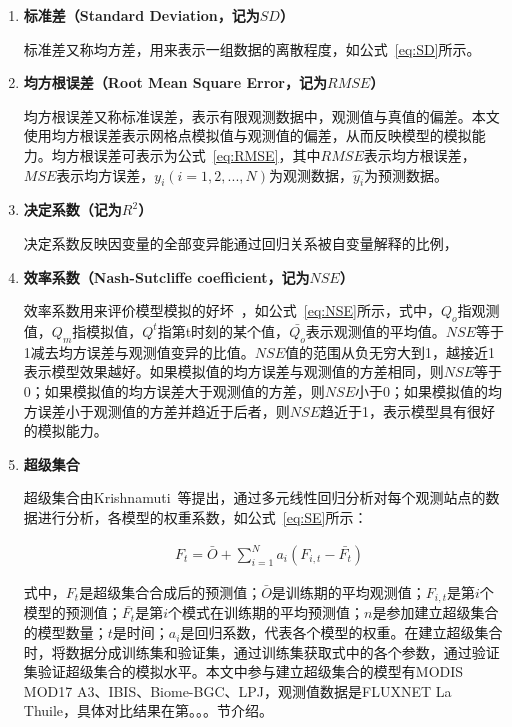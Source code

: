 \begin{enumerate}[(1)]
\item \textbf{标准差（Standard Deviation，记为$SD$）}

标准差又称均方差，用来表示一组数据的离散程度，如公式~\ref{eq:SD}所示。

\item \textbf{均方根误差（Root Mean Square Error，记为$RMSE$）}

均方根误差又称标准误差，表示有限观测数据中，观测值与真值的偏差。本文使用均方根误差表示网格点模拟值与观测值的偏差，从而反映模型的模拟能力。均方根误差可表示为公式~\ref{eq:RMSE}，其中$RMSE$表示均方根误差，$MSE$表示均方误差，$y_i(i=1,2,...,N)$为观测数据，$\hat{y_i}$为预测数据。

\item \textbf{决定系数（记为$R^2$）}

决定系数反映因变量的全部变异能通过回归关系被自变量解释的比例，

\item \textbf{效率系数（Nash-Sutcliffe coefficient，记为$NSE$）}

效率系数用来评价模型模拟的好坏~\cite{gordon2003climate}，如公式~\ref{eq:NSE}所示，式中，$Q_o$指观测值，$Q_m$指模拟值，$Q^t$指第t时刻的某个值，$\bar{Q_o}$表示观测值的平均值。$NSE$等于1减去均方误差与观测值变异的比值。$NSE$值的范围从负无穷大到1，越接近1表示模型效果越好。如果模拟值的均方误差与观测值的方差相同，则$NSE$等于0；如果模拟值的均方误差大于观测值的方差，则$NSE$小于0；如果模拟值的均方误差小于观测值的方差并趋近于后者，则$NSE$趋近于1，表示模型具有很好的模拟能力。

\item \textbf{超级集合}

超级集合由Krishnamuti~\cite{krishnamurti1999improved}等提出，通过多元线性回归分析对每个观测站点的数据进行分析，各模型的权重系数，如公式~\ref{eq:SE}所示：

\begin{align}
    &F_t = \bar{O} + \sum\nolimits_{i=1}^{N}a_i\left(F_{i,t}-\bar{F_t}\right)
    \label{eq:SE}
\end{align}

式中，$F_t$是超级集合合成后的预测值；$\bar{O}$是训练期的平均观测值；$F_{i,t}$是第$i$个模型的预测值；$\bar{F_t}$是第$i$个模式在训练期的平均预测值；$n$是参加建立超级集合的模型数量；$t$是时间；$a_i$是回归系数，代表各个模型的权重。在建立超级集合时，将数据分成训练集和验证集，通过训练集获取式中的各个参数，通过验证集验证超级集合的模拟水平。本文中参与建立超级集合的模型有MODIS MOD17 A3、IBIS、Biome-BGC、LPJ，观测值数据是FLUXNET La Thuile，具体对比结果在第。。。节介绍。

\end{enumerate}

